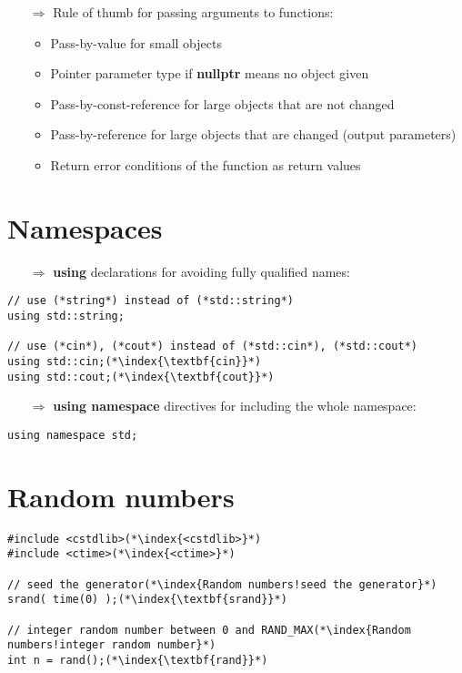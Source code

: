 \documentclass[10pt]{article}
\begin{document}
\begin{enumerate}
\item[$\Rightarrow$] Rule of thumb for passing arguments to functions:
\begin{itemize}
\item Pass-by-value for small objects
\item Pointer parameter type if \textbf{nullptr} means no object given
\item Pass-by-const-reference for large objects that are not changed
\item Pass-by-reference for large objects that are changed (output parameters)
\item Return error conditions of the function as return values
\end{itemize}
\end{enumerate}
%
%
\section{Namespaces}
\small
\begin{enumerate}
\item[$\Rightarrow$] \textbf{using} declarations for avoiding fully qualified names:
\end{enumerate}
\begin{lstlisting}
// use (*string*) instead of (*std::string*)
using std::string;

// use (*cin*), (*cout*) instead of (*std::cin*), (*std::cout*)
using std::cin;(*\index{\textbf{cin}}*)
using std::cout;(*\index{\textbf{cout}}*)
\end{lstlisting}
\begin{enumerate}
\item[$\Rightarrow$] \textbf{using namespace} directives for including the whole namespace:
\end{enumerate}
\begin{lstlisting}
using namespace std;
\end{lstlisting}
%
%
\section{Random numbers}
\small
\begin{lstlisting}
#include <cstdlib>(*\index{<cstdlib>}*)
#include <ctime>(*\index{<ctime>}*)

// seed the generator(*\index{Random numbers!seed the generator}*)
srand( time(0) );(*\index{\textbf{srand}}*)

// integer random number between 0 and RAND_MAX(*\index{Random numbers!integer random number}*)
int n = rand();(*\index{\textbf{rand}}*)
\end{lstlisting}
%
%
\end{document}
